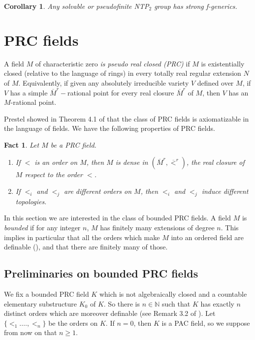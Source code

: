\documentclass[12pt]{article}
\newtheorem{cor}[thm]{Corollary}
\newtheorem{fact}[thm]{Fact}
\theoremstyle{definition}
\theoremstyle{mystyle}
\theoremstyle{remark}
\newcommand{\ntp}{NTP$_2$ }
\begin{document}
\begin{cor}
Any solvable or pseudofinite \ntp group has strong f-generics.
\end{cor}



\section{PRC fields}\label{SPRC}

A field $M$ of characteristic zero \emph{is pseudo real closed
(PRC)} if $M$ is existentially closed (relative to the language of
rings) in every totally real regular extension $N$ of $M$.
Equivalently, if given any absolutely irreducible variety $V$
defined over $M$, if $V$ has a simple $\overline{M}^r-$rational
point for every real closure $\overline{M}^r$ of $M$, then $V$ has
an $M$-rational point.

Prestel showed in Theorem 4.1 of \cite{Pre} that the class of PRC
fields is axiomatizable in the language of fields.
We have the following properties of PRC fields.

\begin{fact}\label{PRCcaracte}
Let $M$ be a PRC field.
\begin{enumerate}
    \item \emph{\cite[Proposition 1.4]{Pre}} If $<$ is an order on $M$, then $M$ is dense in $(\overline{M}^r, \overline{<}^r)$, the real closure of $M$ respect to the order $<$.
    \item \emph{\cite[Proposition 1.6]{Pre}} If $<_i$ and $<_j$ are different orders on $M$, then $<_i$ and $<_j$ induce different topologies.
    \end{enumerate}
\end{fact}


In this section we are interested in the class of bounded PRC fields. A field $M$
is \emph{bounded} if for any integer $n$, $M$ has finitely many
extensions of degree $n$. This implies in particular that all the
orders which make $M$ into an ordered field are definable (\cite[Lemma 3.5]{Mon}), and that there are finitely many of those.


\subsection{Preliminaries on bounded PRC fields}

We fix a bounded PRC field $K$  which is not algebraically closed
and a countable elementary substructure $K_0$ of $K$. So there is
$n \in \mathbb{N}$ such that $K$ has exactly $n$ distinct orders which are moreover definable (see Remark 3.2 of \cite{Mon}). Let
$\{<_1. \ldots, <_n\}$ be the orders on $K$.
If $n=0$, then $K$ is a PAC field, so we suppose from now on that $n\geq1$.
\end{document}
